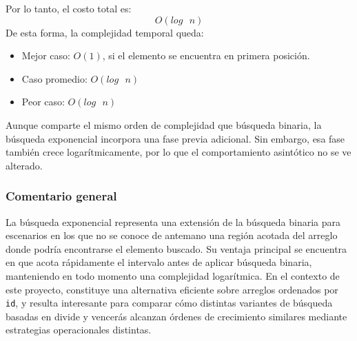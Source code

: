 Por lo tanto, el costo total es: $$O(log\text{ }n)$$
De esta forma, la complejidad temporal queda:
\begin{itemize}
    \item Mejor caso: $O(1)$, si el elemento se encuentra en primera posición.
    \item Caso promedio: $O(log\text{ }n)$
    \item Peor caso: $O(log\text{ }n)$
\end{itemize}

Aunque comparte el mismo orden de complejidad que búsqueda binaria, la búsqueda exponencial incorpora una fase previa adicional. Sin embargo, esa fase también crece logarítmicamente, por lo que el comportamiento asintótico no se ve alterado.

\subsubsection{Comentario general}
La búsqueda exponencial representa una extensión de la búsqueda binaria para escenarios en los que no se conoce de antemano una región acotada del arreglo donde podría encontrarse el elemento buscado. Su ventaja principal se encuentra en que acota rápidamente el intervalo antes de aplicar búsqueda binaria, manteniendo en todo momento una complejidad logarítmica. En el contexto de este proyecto, constituye una alternativa eficiente sobre arreglos ordenados por \texttt{id}, y resulta interesante para comparar cómo distintas variantes de búsqueda basadas en divide y vencerás alcanzan órdenes de crecimiento similares mediante estrategias operacionales distintas.
